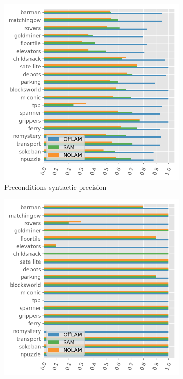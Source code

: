 \begin{figure}[ht]
  \centering

  \begin{subfigure}[b]{0.3\textwidth}
    \includegraphics[width=\textwidth]{figures/10_traces_mini/syn_precision.png}
    \caption{Preconditions syntactic precision}
    \label{fig:syn-precision}
  \end{subfigure}
  \hfill
  \begin{subfigure}[b]{0.3\textwidth}
    \includegraphics[width=\textwidth]{figures/10_traces_mini/solving.png}

\end{subfigure}
\end{figure}
